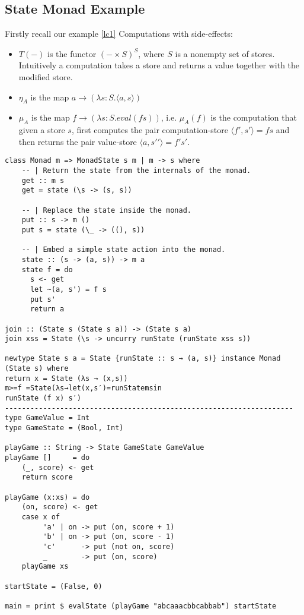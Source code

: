 \subsection{State Monad Example}
Firstly recall our example \ref{lc1}
Computations with side-effects:
\begin{itemize}
    \item $T(-)$ is the functor $(-\times S)^S$, where $S$ is a nonempty set of stores.
        Intuitively a computation takes a store and returns a value together with the modified store.
    \item $\eta_A$ is the map $a \rightarrow (\lambda s:S.\langle a,s \rangle)$
    \item $\mu_A$ is the map $f \rightarrow (\lambda s:S.eval(fs))$,
        i.e. $\mu_A(f)$ is the computation that given a store $s$,
        first computes the pair computation-store $\langle f\prime,s\prime\rangle = fs$
        and then returns the pair value-store $\langle a,s\prime\prime\rangle = f\prime s\prime$.
\end{itemize}

\begin{verbatim}
class Monad m => MonadState s m | m -> s where
    -- | Return the state from the internals of the monad.
    get :: m s
    get = state (\s -> (s, s))

    -- | Replace the state inside the monad.
    put :: s -> m ()
    put s = state (\_ -> ((), s))

    -- | Embed a simple state action into the monad.
    state :: (s -> (a, s)) -> m a
    state f = do
      s <- get
      let ~(a, s') = f s
      put s'
      return a

join :: (State s (State s a)) -> (State s a)
join xss = State (\s -> uncurry runState (runState xss s))

newtype State s a = State {runState :: s → (a, s)} instance Monad (State s) where
return x = State (λs → (x,s))
m>=f =State(λs→let(x,s′)=runStatemsin
runState (f x) s′)
--------------------------------------------------------------------
type GameValue = Int
type GameState = (Bool, Int)

playGame :: String -> State GameState GameValue
playGame []     = do
    (_, score) <- get
    return score

playGame (x:xs) = do
    (on, score) <- get
    case x of
         'a' | on -> put (on, score + 1)
         'b' | on -> put (on, score - 1)
         'c'      -> put (not on, score)
         _        -> put (on, score)
    playGame xs

startState = (False, 0)

main = print $ evalState (playGame "abcaaacbbcabbab") startState
\end{verbatim}
\cite{jones1995functional}

